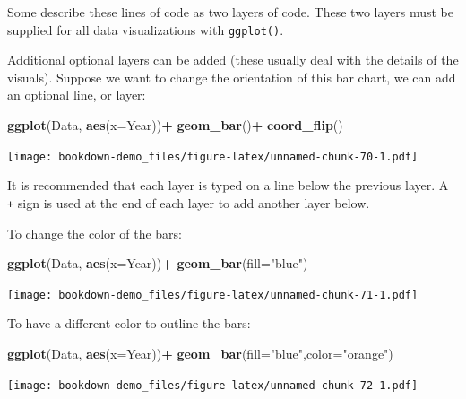 \documentclass[
]{book}
\newenvironment{Shaded}{\begin{snugshade}}{\end{snugshade}}
\newcommand{\AttributeTok}[1]{\textcolor[rgb]{0.13,0.29,0.53}{#1}}
\newcommand{\FunctionTok}[1]{\textcolor[rgb]{0.13,0.29,0.53}{\textbf{#1}}}
\newcommand{\NormalTok}[1]{#1}
\newcommand{\SpecialCharTok}[1]{\textcolor[rgb]{0.81,0.36,0.00}{\textbf{#1}}}
\newcommand{\StringTok}[1]{\textcolor[rgb]{0.31,0.60,0.02}{#1}}
\begin{document}
Some describe these lines of code as two layers of code. These two layers must be supplied for all data visualizations with \texttt{ggplot()}.

Additional optional layers can be added (these usually deal with the details of the visuals). Suppose we want to change the orientation of this bar chart, we can add an optional line, or layer:

\begin{Shaded}
\begin{Highlighting}[]
\FunctionTok{ggplot}\NormalTok{(Data, }\FunctionTok{aes}\NormalTok{(}\AttributeTok{x=}\NormalTok{Year))}\SpecialCharTok{+}
  \FunctionTok{geom\_bar}\NormalTok{()}\SpecialCharTok{+}
  \FunctionTok{coord\_flip}\NormalTok{()}
\end{Highlighting}
\end{Shaded}

\texttt{[image: bookdown-demo\_files/figure-latex/unnamed-chunk-70-1.pdf]}

It is recommended that each layer is typed on a line below the previous layer. A \texttt{+} sign is used at the end of each layer to add another layer below.

To change the color of the bars:

\begin{Shaded}
\begin{Highlighting}[]
\FunctionTok{ggplot}\NormalTok{(Data, }\FunctionTok{aes}\NormalTok{(}\AttributeTok{x=}\NormalTok{Year))}\SpecialCharTok{+}
  \FunctionTok{geom\_bar}\NormalTok{(}\AttributeTok{fill=}\StringTok{"blue"}\NormalTok{)}
\end{Highlighting}
\end{Shaded}

\texttt{[image: bookdown-demo\_files/figure-latex/unnamed-chunk-71-1.pdf]}

To have a different color to outline the bars:

\begin{Shaded}
\begin{Highlighting}[]
\FunctionTok{ggplot}\NormalTok{(Data, }\FunctionTok{aes}\NormalTok{(}\AttributeTok{x=}\NormalTok{Year))}\SpecialCharTok{+}
  \FunctionTok{geom\_bar}\NormalTok{(}\AttributeTok{fill=}\StringTok{"blue"}\NormalTok{,}\AttributeTok{color=}\StringTok{"orange"}\NormalTok{)}
\end{Highlighting}
\end{Shaded}

\texttt{[image: bookdown-demo\_files/figure-latex/unnamed-chunk-72-1.pdf]}
\end{document}
